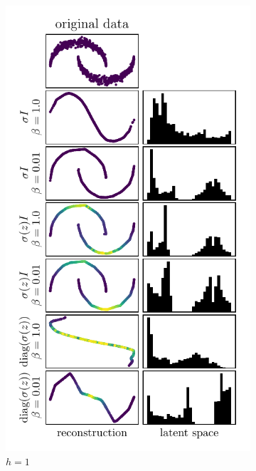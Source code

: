 \begin{figure}
\centering
    \begin{subfigure}[b]{0.45\textwidth}
        \centering
        \includegraphics[scale=0.9]{data/chapter_survey/vae_two_moons_z1_colored}
        \caption{$h=1$}
    \end{subfigure}
    \begin{subfigure}[b]{0.45\textwidth}
        \centering

\end{subfigure}
\end{figure}
